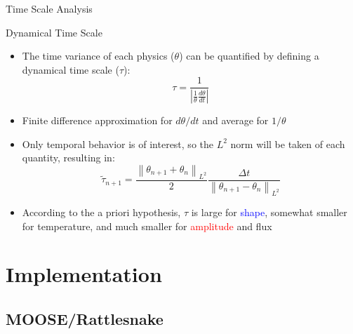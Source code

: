 \documentclass[8pt,xcolor=dvipnames]{beamer}
\newcommand{\be}{\begin{equation*}}
\newcommand{\ee}{\end{equation*}}
\newcommand{\norm}[1]{\left\lVert#1\right\rVert_{L^2}}
\newcommand{\tcr}[1]{\textcolor{red}{#1}}
\newcommand{\tcb}[1]{\textcolor{blue}{#1}}
\begin{document}
\begin{frame}{Time Scale Analysis}

\begin{block}{Dynamical Time Scale}
\begin{itemize}
\item The time variance of each physics ($\theta$) can be quantified by defining a dynamical time scale ($\tau$):
\be
\tau = \frac{1}{\left|\frac{1}{\theta}\frac{d\theta}{dt}\right|}
\ee
\item Finite difference approximation for $d\theta/dt$ and average for $1/\theta$
\item Only temporal behavior is of interest, so the $L^2$ norm will be taken of each quantity, resulting in:
\be
\tilde{\tau}_{n+1} = \frac{\norm{\theta_{n+1} + \theta_{n}}}{2}\frac{\Delta t}{\norm{\theta_{n+1} - \theta_{n}}}
\ee
\item According to the a priori hypothesis, $\tau$ is large for \tcb{shape}, somewhat smaller for temperature, and much smaller for \tcr{amplitude} and flux
\end{itemize}
\end{block}

\end{frame}

\section{Implementation}

\subsection{MOOSE/Rattlesnake}
\end{document}
